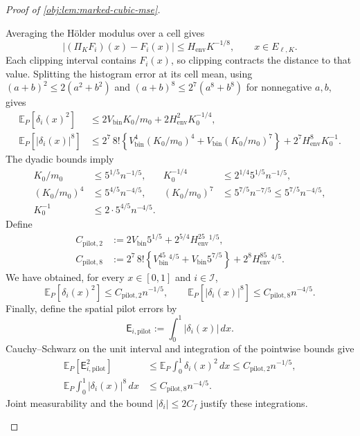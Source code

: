 \documentclass[11pt]{article}
\begin{document}
\begin{proof}[Proof of \cref{obj:lem:marked-cubic-mse}]
\begin{enumerate}
Averaging the Hölder modulus over a cell gives
\[
|(\Pi_KF_i)(x)-F_i(x)|
\le H_{\mathrm{env}}K^{-1/8},
\qquad x\in E_{\ell,K}.
\]
Each clipping interval contains \(F_i(x)\), so clipping contracts the distance to that value. Splitting the histogram error at its cell mean, using
\((a+b)^2\le2(a^2+b^2)\) and
\((a+b)^8\le2^7(a^8+b^8)\) for nonnegative \(a,b\), gives
\[
\begin{aligned}
\mathbb E_P[\delta_i(x)^2]
&\le2V_{\mathrm{bin}}K_0/m_0
+2H_{\mathrm{env}}^2K_0^{-1/4},\\
\mathbb E_P[|\delta_i(x)|^8]
&\le2^7\,8!\left\{
V_{\mathrm{bin}}^4(K_0/m_0)^4
+V_{\mathrm{bin}}(K_0/m_0)^7
\right\}
+2^7H_{\mathrm{env}}^8K_0^{-1}.
\end{aligned}
\]
The dyadic bounds imply
\[
\begin{aligned}
K_0/m_0&\le5^{1/5}n^{-1/5},&
K_0^{-1/4}&\le2^{1/4}5^{1/5}n^{-1/5},\\
(K_0/m_0)^4&\le5^{4/5}n^{-4/5},&
(K_0/m_0)^7&\le5^{7/5}n^{-7/5}
\le5^{7/5}n^{-4/5},\\
K_0^{-1}&\le2\cdot5^{4/5}n^{-4/5}.
\end{aligned}
\]
Define
\[
\begin{aligned}
C_{\mathrm{pilot},2}
&:=2V_{\mathrm{bin}}5^{1/5}
+2^{5/4}H_{\mathrm{env}}^25^{1/5},\\
C_{\mathrm{pilot},8}
&:=2^7\,8!\left\{
V_{\mathrm{bin}}^45^{4/5}
+V_{\mathrm{bin}}5^{7/5}\right\}
+2^8H_{\mathrm{env}}^85^{4/5}.
\end{aligned}
\]
We have obtained, for every \(x\in[0,1]\) and \(i\in\mathcal I\),
\[
\mathbb E_P[\delta_i(x)^2]
\le C_{\mathrm{pilot},2}n^{-1/5},
\qquad
\mathbb E_P[|\delta_i(x)|^8]
\le C_{\mathrm{pilot},8}n^{-4/5}.
\]
Finally, define the spatial pilot errors by
\[
\mathsf E_{i,\mathrm{pilot}}:=\int_0^1|\delta_i(x)|\,dx.
\]
Cauchy--Schwarz on the unit interval and integration of the pointwise bounds give
\[
\begin{aligned}
\mathbb E_P[\mathsf E_{i,\mathrm{pilot}}^2]
&\le\mathbb E_P\int_0^1\delta_i(x)^2\,dx
\le C_{\mathrm{pilot},2}n^{-1/5},\\
\mathbb E_P\int_0^1|\delta_i(x)|^8\,dx
&\le C_{\mathrm{pilot},8}n^{-4/5}.
\end{aligned}
\]
Joint measurability and the bound \(|\delta_i|\le2C_f\) justify these integrations.


\end{enumerate}
\end{proof}
\end{document}
